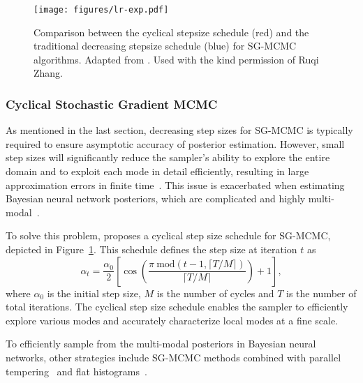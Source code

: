 \begin{figure}[t]
    \centering
\texttt{[image: figures/lr-exp.pdf]}
    \caption{Comparison between the cyclical stepsize schedule (red) and the traditional decreasing stepsize schedule (blue) for SG-MCMC algorithms. Adapted from
\citet{zhangcyclical}. Used with the kind permission of Ruqi Zhang.}
    \label{fig: csgmcmc}
\end{figure}
\subsubsection{Cyclical Stochastic Gradient MCMC}
As mentioned in the last section, decreasing step sizes for SG-MCMC is typically required to ensure asymptotic accuracy of posterior estimation. However, small step sizes will significantly reduce the sampler's ability to explore the entire domain and to exploit each mode in detail efficiently, resulting in large approximation errors in finite time~\citep{vollmer2016exploration,chen2015convergence}. This issue is exacerbated when estimating Bayesian neural network posteriors, which are complicated and highly multi-modal~\citep{neal1996bayesian,izmailov2021bayesian}. 

To solve this problem, \cite{zhangcyclical} proposes a cyclical step size schedule for SG-MCMC, depicted in Figure~\ref{fig: csgmcmc}. This schedule defines the step size at iteration $t$ as
\begin{equation}
\alpha_t = \frac{\alpha_0}{2}
\left[\cos\left(\frac{\pi~\text{mod}(t-1,\lceil T/M\rceil)}{\lceil T/M\rceil}\right)+1
\right], \label{eq:cyclic_lr}
\end{equation}
where $\alpha_0$ is the initial step size, $M$ is the number of cycles and $T$ is the number of total iterations. The cyclical step size schedule enables the sampler to efficiently explore various modes and accurately characterize local modes at a fine scale. 

To efficiently sample from the multi-modal posteriors in Bayesian neural networks, other strategies include SG-MCMC methods combined with parallel tempering~\citep{deng2020non} and flat histograms~\citep{deng2020contour}.



 


